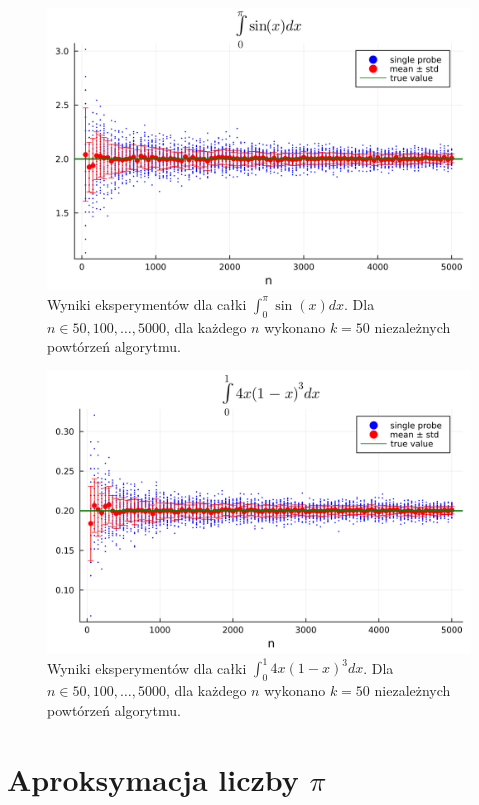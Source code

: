 \documentclass{article}
\begin{document}
\begin{figure}[!h]
    \centering
    \includegraphics[width=\linewidth]{results/z1_2.png}
    \caption{Wyniki eksperymentów dla całki $\int_0^{\pi} \sin(x) dx$. Dla $n \in {50, 100, \dots, 5000}$, dla każdego $n$ wykonano $k=50$ niezależnych powtórzeń algorytmu.}
\end{figure}

\begin{figure}[!h]
    \centering
    \includegraphics[width=\linewidth]{results/z1_3.png}
    \caption{Wyniki eksperymentów dla całki $\int_0^1 4x(1-x)^3 dx$. Dla $n \in {50, 100, \dots, 5000}$, dla każdego $n$ wykonano $k=50$ niezależnych powtórzeń algorytmu.}
\end{figure}



\section{Aproksymacja liczby $\pi$}
\end{document}
